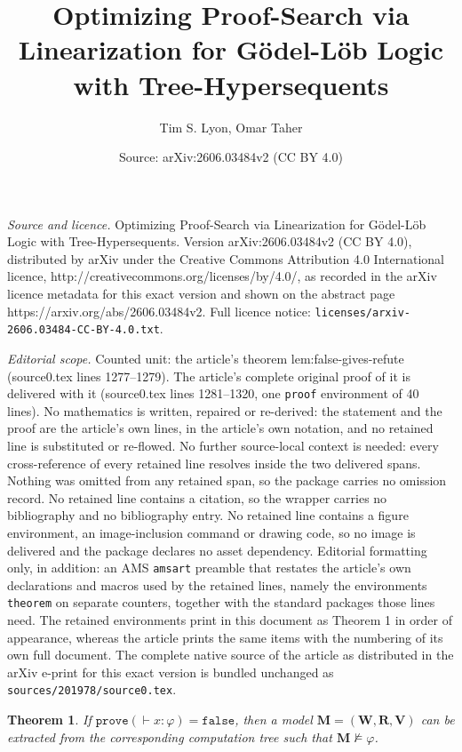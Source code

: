 \documentclass[10pt,a4paper]{amsart}
\title{Optimizing Proof-Search via Linearization for Gödel-Löb Logic with Tree-Hypersequents}
\author{Tim S. Lyon, Omar Taher}
\date{Source: arXiv:2606.03484v2 (CC BY 4.0)}
\newtheorem{theorem}{Theorem}
\newcommand{\M}{\mathbf{M}}
\newcommand{\R}{\mathbf{R}}
\newcommand{\V}{\mathbf{V}}
\newcommand{\W}{\mathbf{W}}
\newcommand{\false}{\mathtt{false}}
\renewcommand{\phi}{\varphi}
\newcommand{\prove}{\mathtt{prove}}
\newcommand{\sar}{\vdash}
\begin{document}
\maketitle

\noindent\emph{Source and licence.} Optimizing Proof-Search via Linearization for Gödel-Löb Logic with Tree-Hypersequents. Version arXiv:2606.03484v2 (CC BY 4.0), distributed by arXiv under the Creative Commons Attribution 4.0 International licence, http://creativecommons.org/licenses/by/4.0/, as recorded in the arXiv licence metadata for this exact version and shown on the abstract page https://arxiv.org/abs/2606.03484v2. Full licence notice: \texttt{licenses/arxiv-2606.03484-CC-BY-4.0.txt}.\par\smallskip

\noindent\textit{Editorial scope.} Counted unit: the article's theorem lem:false-gives-refute (source0.tex lines 1277--1279). The article's complete original proof of it is delivered with it (source0.tex lines 1281--1320, one \texttt{proof} environment of 40 lines). No mathematics is written, repaired or re-derived: the statement and the proof are the article's own lines, in the article's own notation, and no retained line is substituted or re-flowed.  No further source-local context is needed: every cross-reference of every retained line resolves inside the two delivered spans.  Nothing was omitted from any retained span, so the package carries no omission record.  No retained line contains a citation, so the wrapper carries no bibliography and no bibliography entry.  No retained line contains a figure environment, an image-inclusion command or drawing code, so no image is delivered and the package declares no asset dependency.  Editorial formatting only, in addition: an AMS \texttt{amsart} preamble that restates the article's own declarations and macros used by the retained lines, namely the environments \texttt{theorem} on separate counters, together with the standard packages those lines need.  The retained environments print in this document as Theorem 1 in order of appearance, whereas the article prints the same items with the numbering of its own full document.  The complete native source of the article as distributed in the arXiv e-print for this exact version is bundled unchanged as \texttt{sources/201978/source0.tex}.
\begin{theorem}\label{lem:false-gives-refute}
If $\prove( \sar x : \phi) = \false$, then a model $\M = (\W,\R,\V)$ can be extracted from the corresponding computation tree such that $\M \not\models \phi$.
\end{theorem}
\end{document}
